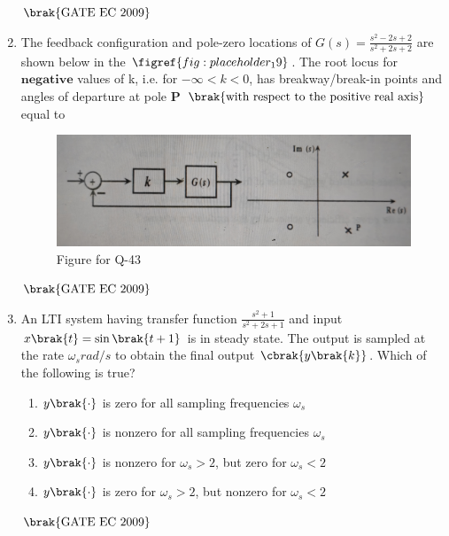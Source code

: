 \documentclass[journal,12pt,onecolumn]{IEEEtran}
\theoremstyle{remark}
\begin{document}
\begin{enumerate}
\begin{enumerate}
\begin{multicols}{2}
    \end{multicols}
\end{enumerate}
\hfill $\brak{\text{GATE EC 2009}}$

\item The feedback configuration and pole-zero locations of $G(s) = \frac{s^2 -2s +2}{s^2 +2s +2}$ are shown below in the $\figref{fig:placeholder_19}$. The root locus for $\textbf{negative}$ values of k, i.e. for $-\infty < k<0$, has breakway/break-in points and angles of departure at pole $\textbf{P}$ $\brak{\text{with respect to the positive real axis}}$ equal to 
\begin{figure}[H]
    \centering
    \includegraphics[width=0.5\columnwidth]{figs/fig_19.jpg}
    \caption{\centering Figure for Q-43}
    \label{fig:placeholder_19}
\end{figure}
\begin{enumerate}
\end{enumerate}
\hfill $\brak{\text{GATE EC 2009}}$


\item An LTI system having transfer function $\frac{s^2+1}{s^2 +2s +1}$ and input $x\brak{t} = \sin\brak{t+1}$ is in steady state. The output is sampled at the rate $\omega_s rad/s$ to obtain the final output $\cbrak{ y\brak{k}}$. Which of the following is true?
\begin{enumerate}
        \item $y\brak{\cdot}$ is zero for all sampling frequencies $\omega_s$
        \item $y\brak{\cdot}$ is nonzero for all sampling frequencies $\omega_s$
        \item $y\brak{\cdot}$ is nonzero for $\omega_s>2$, but zero for $\omega_s<2$
        \item $y\brak{\cdot}$ is zero for $\omega_s>2$, but nonzero for $\omega_s<2$
\end{enumerate}
\hfill $\brak{\text{GATE EC 2009}}$


\end{enumerate}
\end{document}

